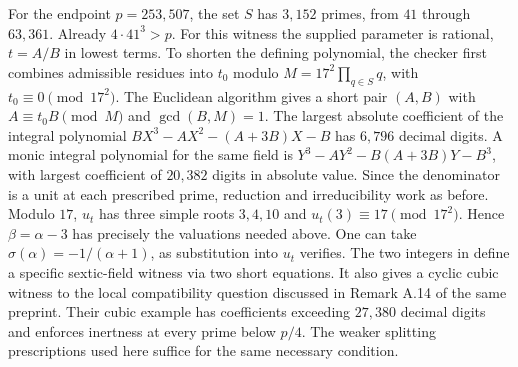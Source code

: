 For the endpoint $p=253{,}507$, the set $S$ has $3{,}152$ primes, from
$41$ through $63{,}361$. Already $4\cdot41^3>p$.
For this witness the supplied parameter is rational, $t=A/B$ in lowest
terms. To shorten the defining polynomial, the checker first combines
admissible residues into $t_0$ modulo $M=17^2\prod_{q\in S}q$, with
$t_0\equiv0\pmod{17^2}$. The Euclidean algorithm gives a short pair
$(A,B)$ with $A\equiv t_0 B\pmod M$ and $\gcd(B,M)=1$.
The largest absolute coefficient of the integral polynomial
$B X^3-A X^2-(A+3B)X-B$ has $6{,}796$ decimal digits. A monic integral
polynomial for the same field is
$Y^3-A Y^2-B(A+3B)Y-B^3$, with largest coefficient of $20{,}382$
digits in absolute value. Since the
denominator is a unit at each prescribed prime, reduction and
irreducibility work as before. Modulo $17$, $u_t$ has three simple
roots $3,4,10$ and $u_t(3)\equiv17\pmod{17^2}$. Hence
$\beta=\alpha-3$ has precisely the valuations needed above. One can take
$\sigma(\alpha)=-1/(\alpha+1)$, as substitution into $u_t$ verifies.
The two integers in  define a specific sextic-field
witness via two short equations. It also gives a cyclic cubic witness
to the local compatibility question discussed in Remark A.14 of the same
preprint. Their cubic example has coefficients exceeding $27{,}380$
decimal digits and enforces inertness at every prime below $p/4$.
The weaker splitting prescriptions used here suffice for the same
necessary condition.
